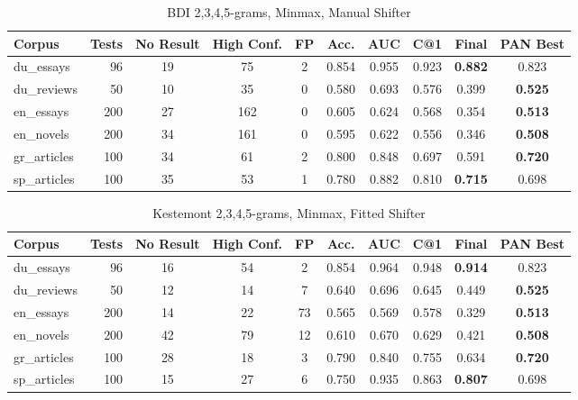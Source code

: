 \documentclass[
    hf
]{ceurart}
\begin{document}
\begin{table}
    \caption{BDI 2,3,4,5-grams, Minmax, Manual Shifter}
    \label{tab:bdi}
    \raggedright
    \begin{tabular}{@{}lrcccccccc}
        \toprule
        Corpus       & Tests & No Result & High Conf. & FP & Acc.  & AUC   & C@1   & Final          & PAN Best       \\
        \midrule
        du\_essays   & 96    & 19        & 75         & 2  & 0.854 & 0.955 & 0.923 & \textbf{0.882} & 0.823          \\
        du\_reviews  & 50    & 10        & 35         & 0  & 0.580 & 0.693 & 0.576 & 0.399          & \textbf{0.525} \\
        en\_essays   & 200   & 27        & 162        & 0  & 0.605 & 0.624 & 0.568 & 0.354          & \textbf{0.513} \\
        en\_novels   & 200   & 34        & 161        & 0  & 0.595 & 0.622 & 0.556 & 0.346          & \textbf{0.508} \\
        gr\_articles & 100   & 34        & 61         & 2  & 0.800 & 0.848 & 0.697 & 0.591          & \textbf{0.720} \\
        sp\_articles & 100   & 35        & 53         & 1  & 0.780 & 0.882 & 0.810 & \textbf{0.715} & 0.698          \\
        \bottomrule
    \end{tabular}
\end{table}

\begin{table}
    \caption{Kestemont 2,3,4,5-grams, Minmax, Fitted Shifter}
    \label{tab:o2v}
    \raggedright
    \begin{tabular}{lrcccccccc}
        \toprule
        Corpus       & Tests & No Result & High Conf. & FP & Acc.  & AUC   & C@1   & Final          & PAN Best       \\
        \midrule
        du\_essays   & 96    & 16        & 54         & 2  & 0.854 & 0.964 & 0.948 & \textbf{0.914} & 0.823          \\
        du\_reviews  & 50    & 12        & 14         & 7  & 0.640 & 0.696 & 0.645 & 0.449          & \textbf{0.525} \\
        en\_essays   & 200   & 14        & 22         & 73 & 0.565 & 0.569 & 0.578 & 0.329          & \textbf{0.513} \\
        en\_novels   & 200   & 42        & 79         & 12 & 0.610 & 0.670 & 0.629 & 0.421          & \textbf{0.508} \\
        gr\_articles & 100   & 28        & 18         & 3  & 0.790 & 0.840 & 0.755 & 0.634          & \textbf{0.720} \\
        sp\_articles & 100   & 15        & 27         & 6  & 0.750 & 0.935 & 0.863 & \textbf{0.807} & 0.698          \\
        \bottomrule
    \end{tabular}
\end{table}
\end{document}

